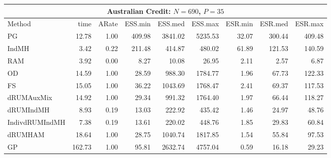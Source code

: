 \begin{table}
\tablesize
\centering
\begin{tabular}{l r r r r r r r r } 
\hline
\multicolumn{9}{c}{Australian Credit: $N = 690$, $P=35$} \\
\hline
          Method  &     time &    ARate &  ESS.min &  ESS.med &  ESS.max &  ESR.min &  ESR.med &  ESR.max \\ 
              PG  &    12.78 &     1.00 &   409.98 &  3841.02 &  5235.53 &    32.07 &   300.44 &   409.48 \\ 
           IndMH  &     3.42 &     0.22 &   211.48 &   414.87 &   480.02 &    61.89 &   121.53 &   140.59 \\ 
             RAM  &     3.92 &     0.00 &     8.27 &    10.08 &    26.95 &     2.11 &     2.57 &     6.87 \\ 
              OD  &    14.59 &     1.00 &    28.59 &   988.30 &  1784.77 &     1.96 &    67.73 &   122.33 \\ 
              FS  &    15.05 &     1.00 &    36.22 &  1043.69 &  1768.47 &     2.41 &    69.37 &   117.53 \\ 
      dRUMAuxMix  &    14.92 &     1.00 &    29.34 &   991.32 &  1764.40 &     1.97 &    66.44 &   118.27 \\ 
       dRUMIndMH  &     8.93 &     0.19 &    13.03 &   222.92 &   435.42 &     1.46 &    24.97 &    48.76 \\ 
  IndivdRUMIndMH  &     7.38 &     0.19 &    13.61 &   220.02 &   448.76 &     1.85 &    29.83 &    60.84 \\ 
         dRUMHAM  &    18.64 &     1.00 &    28.75 &  1040.74 &  1817.85 &     1.54 &    55.84 &    97.53 \\ 
              GP  &   162.73 &     1.00 &    95.81 &  2632.74 &  4757.04 &     0.59 &    16.18 &    29.23
 \end{tabular}


\end{table}
